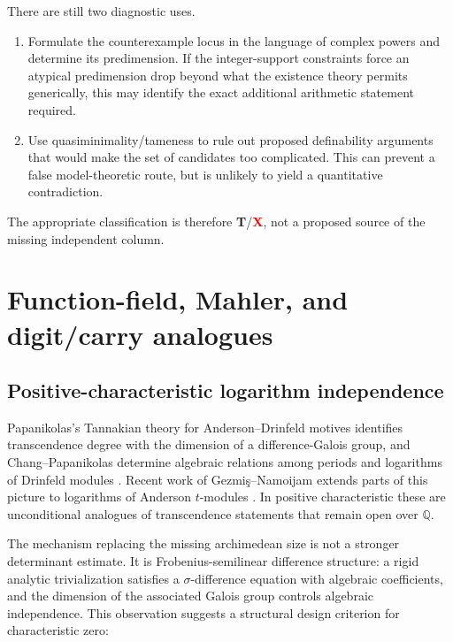 \documentclass[10pt,letterpaper]{article}
\newcommand{\Q}{\mathbb Q}
\newcommand{\badgeTemplate}{\textcolor{amber}{\textbf{T}}}
\newcommand{\badgeDiagnostic}{\textcolor{red}{\textbf{X}}}
\begin{document}
There are still two diagnostic uses.

\begin{enumerate}
\item Formulate the counterexample locus in the language of complex powers and determine its
predimension.  If the integer-support constraints force an atypical predimension drop beyond
what the existence theory permits generically, this may identify the exact additional
arithmetic statement required.
\item Use quasiminimality/tameness to rule out proposed definability arguments that would
make the set of candidates too complicated.  This can prevent a false model-theoretic route,
but is unlikely to yield a quantitative contradiction.
\end{enumerate}

The appropriate classification is therefore \badgeTemplate/\badgeDiagnostic, not a proposed
source of the missing independent column.

\section{Function-field, Mahler, and digit/carry analogues}
\label{sec:analogues}

\subsection{Positive-characteristic logarithm independence}

Papanikolas's Tannakian theory for Anderson--Drinfeld motives identifies transcendence degree
with the dimension of a difference-Galois group, and Chang--Papanikolas determine algebraic
relations among periods and logarithms of Drinfeld modules
\cite{Papanikolas2008,ChangPapanikolas}.  Recent work of Gezmi\c{s}--Namoijam extends parts of
this picture to logarithms of Anderson \(t\)-modules \cite{GezmisNamoijam}.  In positive
characteristic these are unconditional analogues of transcendence statements that remain
open over \(\Q\).

The mechanism replacing the missing archimedean size is not a stronger determinant estimate.
It is Frobenius-semilinear difference structure: a rigid analytic trivialization satisfies a
\(\sigma\)-difference equation with algebraic coefficients, and the dimension of the
associated Galois group controls algebraic independence.  This observation suggests a
structural design criterion for characteristic zero:
\end{document}
